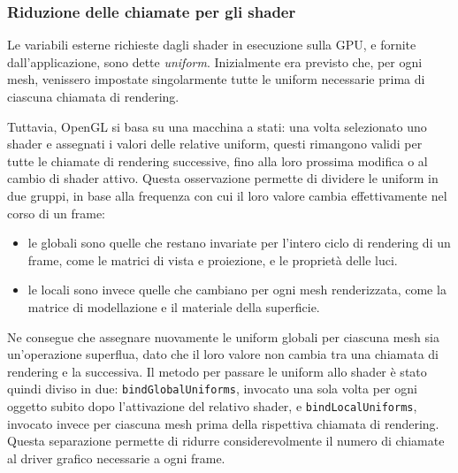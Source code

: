 

\subsubsection{Riduzione delle chiamate per gli shader}
Le variabili esterne richieste dagli shader in esecuzione sulla GPU, e fornite dall'applicazione, sono dette \emph{uniform}.
Inizialmente era previsto che, per ogni mesh, venissero impostate singolarmente tutte le uniform necessarie prima di ciascuna chiamata di rendering.

Tuttavia, OpenGL si basa su una macchina a stati: una volta selezionato uno shader e assegnati i valori delle relative uniform, questi rimangono validi per tutte le chiamate di rendering successive, fino alla loro prossima modifica o al cambio di shader attivo. Questa osservazione permette di dividere le uniform in due gruppi, in base alla frequenza con cui il loro valore cambia effettivamente nel corso di un frame:
\begin{itemize}
    \item le globali sono quelle che restano invariate per l'intero ciclo di rendering di un frame, come le matrici di vista e proiezione, e le proprietà delle luci.
    \item le locali sono invece quelle che cambiano per ogni mesh renderizzata, come la matrice di modellazione e il materiale della superficie.
\end{itemize}

Ne consegue che assegnare nuovamente le uniform globali per ciascuna mesh sia un'operazione superflua, dato che il loro valore non cambia tra una chiamata di rendering e la successiva.
Il metodo per passare le uniform allo shader è stato quindi diviso in due: \texttt{bindGlobalUniforms}, invocato una sola volta per ogni oggetto subito dopo l'attivazione del relativo shader, e \texttt{bindLocalUniforms}, invocato invece per ciascuna mesh prima della rispettiva chiamata di rendering. Questa separazione permette di ridurre considerevolmente il numero di chiamate al driver grafico necessarie a ogni frame.

%
%
